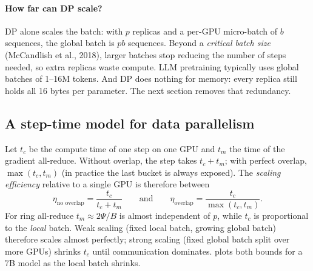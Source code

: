 \paragraph{How far can DP scale?} DP alone scales the batch: with $p$ replicas and a per-GPU
micro-batch of $b$ sequences, the global batch is $pb$ sequences. Beyond a \emph{critical batch
size} (McCandlish et al., 2018), larger batches stop reducing the number of steps needed, so
extra replicas waste compute. LLM pretraining typically uses global batches of 1--16M tokens.
And DP does nothing for memory: every replica still holds all 16 bytes per parameter. The next
section removes that redundancy.

\subsection{A step-time model for data parallelism}\label{sec:dist:dpmodel}
Let $t_c$ be the compute time of one step on one GPU and $t_m$ the time of the gradient
all-reduce. Without overlap, the step takes $t_c+t_m$; with perfect overlap,
$\max(t_c,t_m)$ (in practice the last bucket is always exposed). The \emph{scaling efficiency}
relative to a single GPU is therefore between
\begin{equation}
\eta_{\text{no overlap}}=\frac{t_c}{t_c+t_m}\qquad\text{and}\qquad
\eta_{\text{overlap}}=\frac{t_c}{\max(t_c,t_m)}.
\end{equation}
For ring all-reduce $t_m\approx 2\Psi/B$ is almost independent of $p$, while $t_c$ is
proportional to the \emph{local} batch. Weak scaling (fixed local batch, growing global batch)
therefore scales almost perfectly; strong scaling (fixed global batch split over more GPUs)
shrinks $t_c$ until communication dominates.  plots both bounds for a 7B
model as the local batch shrinks.

